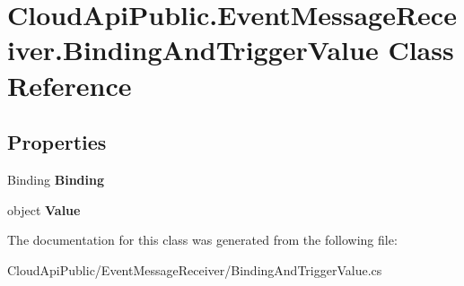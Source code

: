 \hypertarget{class_cloud_api_public_1_1_event_message_receiver_1_1_binding_and_trigger_value}{\section{Cloud\-Api\-Public.\-Event\-Message\-Receiver.\-Binding\-And\-Trigger\-Value Class Reference}
\label{class_cloud_api_public_1_1_event_message_receiver_1_1_binding_and_trigger_value}
}
\subsection*{Properties}
\begin{DoxyCompactItemize}
\item 
\hypertarget{class_cloud_api_public_1_1_event_message_receiver_1_1_binding_and_trigger_value_aec905a965c8f564c96e186227751aac8}{Binding {\bfseries Binding}}\label{class_cloud_api_public_1_1_event_message_receiver_1_1_binding_and_trigger_value_aec905a965c8f564c96e186227751aac8}

\item 
\hypertarget{class_cloud_api_public_1_1_event_message_receiver_1_1_binding_and_trigger_value_a430b078ad30b809adbd242c3ea896177}{object {\bfseries Value}}\label{class_cloud_api_public_1_1_event_message_receiver_1_1_binding_and_trigger_value_a430b078ad30b809adbd242c3ea896177}

\end{DoxyCompactItemize}


The documentation for this class was generated from the following file\-:\begin{DoxyCompactItemize}
\item 
Cloud\-Api\-Public/\-Event\-Message\-Receiver/Binding\-And\-Trigger\-Value.\-cs\end{DoxyCompactItemize}
